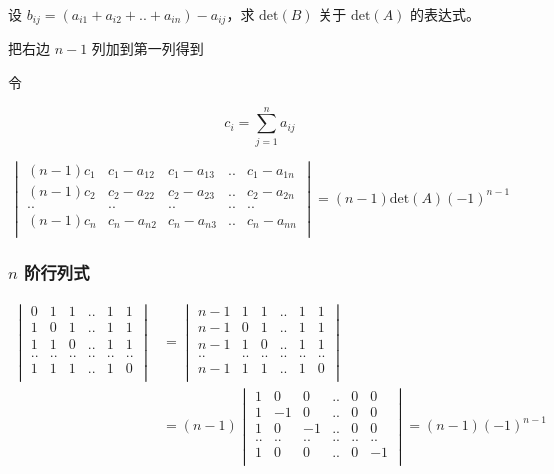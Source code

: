 \documentclass[12pt,a4paper]{ctexart}
\begin{document}
设 $b_{ij} = (a_{i1} + a_{i2} + .. + a_{in}) - a_{ij}$，求 $\text{det}(B)$ 关于 $\text{det}(A)$ 的表达式。


把右边 $n-1$ 列加到第一列得到

令

\[
c_i = \sum_{j=1}^{n}a_{ij}
\]

\[
\begin{vmatrix}
    (n-1)c_1 & c_1 - a_{12} & c_1 - a_{13} & .. & c_1-a_{1n} \\
    (n-1)c_2 & c_2 - a_{22} & c_2 - a_{23} & .. & c_2-a_{2n} \\
    .. & .. &.. &.. &.. \\
    (n-1)c_n & c_n - a_{n2} & c_n - a_{n3} & .. & c_n-a_{nn} \\
\end{vmatrix} = (n-1) \text{det}(A)(-1)^{n-1}
\]

\subsubsection{$n$ 阶行列式}

\begin{align*}
    \begin{vmatrix}
        0 & 1 & 1 & .. & 1 & 1 \\
        1 & 0 & 1 & .. & 1 & 1 \\
        1 & 1 & 0 & .. & 1 & 1 \\
        .. & .. &.. &.. &.. & .. \\ 
        1 & 1 & 1 & .. & 1 & 0 \\
    \end{vmatrix} &=     \begin{vmatrix}
        n-1 & 1 & 1 & .. & 1 & 1 \\
        n-1 & 0 & 1 & .. & 1 & 1 \\
        n-1 & 1 & 0 & .. & 1 & 1 \\
        .. & .. &.. &.. &.. & .. \\ 
        n-1 & 1 & 1 & .. & 1 & 0 \\
    \end{vmatrix} \\
    &= (n-1)\begin{vmatrix}
        1 & 0 & 0 & .. & 0 & 0 \\
        1 & -1 & 0 & .. & 0 & 0 \\
        1 & 0 & -1 & .. & 0 & 0 \\
        .. & .. &.. &.. &.. & .. \\ 
        1 & 0 & 0 & .. & 0 & -1 \\
    \end{vmatrix} = (n-1)(-1)^{n-1}
\end{align*}
\end{document}
